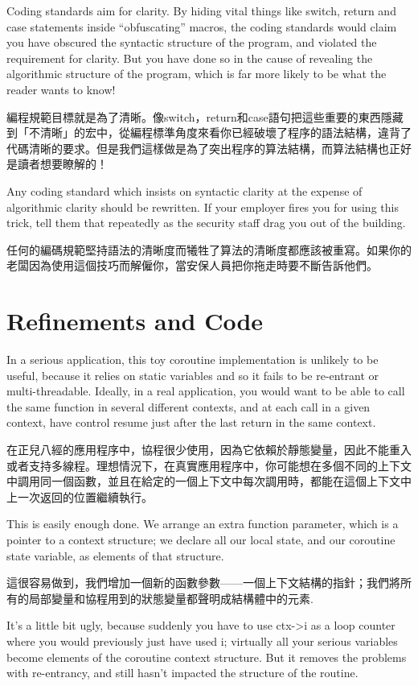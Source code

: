 \documentclass[12pt]{article}
\begin{document}
\begin{CJK}{UTF8}{bsmi}
Coding standards aim for clarity. By hiding vital things like switch, return and case statements inside ``obfuscating'' macros, the coding standards would claim you have obscured the syntactic structure of the program, and violated the requirement for clarity. But you have done so in the cause of revealing the algorithmic structure of the program, which is far more likely to be what the reader wants to know!

編程規範目標就是為了清晰。像switch，return和case語句把這些重要的東西隱藏到「不清晰」的宏中，從編程標準角度來看你已經破壞了程序的語法結構，違背了代碼清晰的要求。但是我們這樣做是為了突出程序的算法結構，而算法結構也正好是讀者想要瞭解的！

Any coding standard which insists on syntactic clarity at the expense of algorithmic clarity should be rewritten. If your employer fires you for using this trick, tell them that repeatedly as the security staff drag you out of the building.

 任何的編碼規範堅持語法的清晰度而犧牲了算法的清晰度都應該被重寫。如果你的老闆因為使用這個技巧而解僱你，當安保人員把你拖走時要不斷告訴他們。 
\section{Refinements and Code}

In a serious application, this toy coroutine implementation is unlikely to be useful, because it relies on static variables and so it fails to be re-entrant or multi-threadable. Ideally, in a real application, you would want to be able to call the same function in several different contexts, and at each call in a given context, have control resume just after the last return in the same context.

 在正兒八經的應用程序中，協程很少使用，因為它依賴於靜態變量，因此不能重入或者支持多線程。理想情況下，在真實應用程序中，你可能想在多個不同的上下文中調用同一個函數，並且在給定的一個上下文中每次調用時，都能在這個上下文中上一次返回的位置繼續執行。 

This is easily enough done. We arrange an extra function parameter, which is a pointer to a context structure; we declare all our local state, and our coroutine state variable, as elements of that structure.

 這很容易做到，我們增加一個新的函數參數——一個上下文結構的指針；我們將所有的局部變量和協程用到的狀態變量都聲明成結構體中的元素. 

It's a little bit ugly, because suddenly you have to use ctx->i as a loop counter where you would previously just have used i; virtually all your serious variables become elements of the coroutine context structure. But it removes the problems with re-entrancy, and still hasn't impacted the structure of the routine.


\end{CJK}
\end{document}
